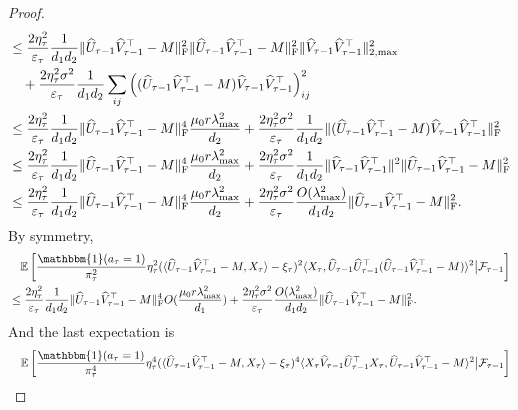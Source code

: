 \documentclass[12pt]{article}
\newcommand\fro[1]{\| #1 \|_{\rm{F}}}
\newcommand{\inp}[2]{\langle #1,#2\rangle}
\def\EE{{\mathbb E}}
\theoremstyle{plain}
\begin{document}
\begin{proof}
\begin{align*}
        &\leq \frac{2\eta_{\tau}^2}{\varepsilon_{\tau}}\frac{1}{d_1d_2}\fro{\widehat{U}_{\tau-1}\widehat{V}_{\tau-1}^{\top} - M}^2\fro{\widehat{U}_{\tau-1}\widehat{V}_{\tau-1}^{\top} - M}^2\|\widehat{V}_{\tau-1}\widehat{V}_{\tau-1}^{\top}\|_{2,\max}^2 \\ &\quad + \frac{2\eta_{\tau}^2\sigma^2}{\varepsilon_{\tau}}\frac{1}{d_1d_2}\sum_{ij}\left((\widehat{U}_{\tau-1}\widehat{V}_{\tau-1}^{\top} - M)\widehat{V}_{\tau-1}\widehat{V}_{\tau-1}^{\top}\right)_{ij}^2 \\
        &\leq \frac{2\eta_{\tau}^2}{\varepsilon_{\tau}}\frac{1}{d_1d_2}\fro{\widehat{U}_{\tau-1}\widehat{V}_{\tau-1}^{\top} - M}^4\frac{\mu_0r\lambda_{\max}^2}{d_2} + \frac{2\eta_{\tau}^2\sigma^2}{\varepsilon_{\tau}}\frac{1}{d_1d_2}\fro{(\widehat{U}_{\tau-1}\widehat{V}_{\tau-1}^{\top} - M)\widehat{V}_{\tau-1}\widehat{V}_{\tau-1}^{\top}}^2 \\
        &\leq  \frac{2\eta_{\tau}^2}{\varepsilon_{\tau}}\frac{1}{d_1d_2}\fro{\widehat{U}_{\tau-1}\widehat{V}_{\tau-1}^{\top} - M}^4\frac{\mu_0r\lambda_{\max}^2}{d_2} + \frac{2\eta_{\tau}^2\sigma^2}{\varepsilon_{\tau}}\frac{1}{d_1d_2}\|\widehat{V}_{\tau-1}\widehat{V}_{\tau-1}^{\top}\|^2\fro{\widehat{U}_{\tau-1}\widehat{V}_{\tau-1}^{\top} - M}^2 \\
        &\leq \frac{2\eta_{\tau}^2}{\varepsilon_{\tau}}\frac{1}{d_1d_2}\fro{\widehat{U}_{\tau-1}\widehat{V}_{\tau-1}^{\top} - M}^4\frac{\mu_0r\lambda_{\max}^2}{d_2} + \frac{2\eta_{\tau}^2\sigma^2}{\varepsilon_{\tau}}\frac{O(\lambda_{\max}^2)}{d_1d_2}\fro{\widehat{U}_{\tau-1}\widehat{V}_{\tau-1}^{\top} - M}^2.
    \end{align*}
    By symmetry,
    \begin{align*}
        &\quad \EE\left[\frac{\mathbbm{1}(a_\tau=1)}{\pi_{\tau}^2}\eta_{\tau}^2 (\inp{\widehat{U}_{\tau-1}\widehat{V}_{\tau-1}^{\top} - M}{X_{\tau}}-\xi_{\tau})^2\inp{X_{\tau}}{\widehat{U}_{\tau-1}\widehat{U}_{\tau-1}^{\top}(\widehat{U}_{\tau-1}\widehat{V}_{\tau-1}^{\top} - M)}^2\big|\mathcal{F}_{\tau-1}\right] \\
        &\leq \frac{2\eta_{\tau}^2}{\varepsilon_{\tau}}\frac{1}{d_1d_2}\fro{\widehat{U}_{\tau-1}\widehat{V}_{\tau-1}^{\top} - M}^4O(\frac{\mu_0r\lambda_{\max}^2}{d_1}) + \frac{2\eta_{\tau}^2\sigma^2}{\varepsilon_{\tau}}\frac{O(\lambda_{\max}^2)}{d_1d_2}\fro{\widehat{U}_{\tau-1}\widehat{V}_{\tau-1}^{\top} - M}^2.
    \end{align*}
    And the last expectation is
    \begin{align*}
        &\quad \EE\left[\frac{\mathbbm{1}(a_\tau=1)}{\pi_{\tau}^4}\eta_{\tau}^4 (\inp{\widehat{U}_{\tau-1}\widehat{V}_{\tau-1}^{\top} - M}{X_{\tau}}-\xi_{\tau})^4\inp{X_{\tau}\widehat{V}_{\tau-1}\widehat{U}_{\tau-1}^{\top}X_{\tau}}{\widehat{U}_{\tau-1}\widehat{V}_{\tau-1}^{\top} - M}^2\big|\mathcal{F}_{\tau-1}\right] \\

\end{align*}
\end{proof}
\end{document}
